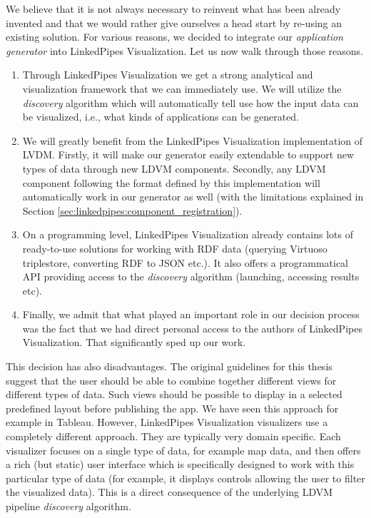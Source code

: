 We believe that it is not always necessary to reinvent what has been already invented and that we would rather give ourselves a head start by re-using an existing solution. For various reasons, we decided to integrate our \emph{application generator} into LinkedPipes Visualization. Let us now walk through those reasons.

\begin{enumerate}
\item Through LinkedPipes Visualization we get a strong analytical and visualization framework that we can immediately use. We will utilize the \emph{discovery} algorithm which will automatically tell use how the input data can be visualized, i.e., what kinds of applications can be generated.
\item We will greatly benefit from the LinkedPipes Visualization implementation of LVDM. Firstly, it will make our generator easily extendable to support new types of data through new LDVM components. Secondly, any LDVM component following the format defined by this implementation will automatically work in our generator as well (with the limitations explained in Section \ref{sec:linkedpipes:component_registration}).
\item On a programming level, LinkedPipes Visualization already contains lots of ready-to-use solutions for working with RDF data (querying Virtuoso triplestore, converting RDF to JSON etc.). It also offers a programmatical API providing access to the \emph{discovery} algorithm (launching, accessing results etc).
\item Finally, we admit that what played an important role in our decision process was the fact that we had direct personal access to the authors of LinkedPipes Visualization. That significantly sped up our work.

\end{enumerate}
This decision has also disadvantages. The original guidelines for this thesis suggest that the user should be able to combine together different views for different types of data. Such views should be possible to display in a selected predefined layout before publishing the app. We have seen this approach for example in Tableau. However, LinkedPipes Visualization visualizers use a completely different approach. They are typically very domain specific. Each visualizer focuses on a single type of data, for example map data, and then offers a rich (but static) user interface which is specifically designed to work with this particular type of data (for example, it displays controls allowing the user to filter the visualized data). This is a direct consequence of the underlying LDVM pipeline \emph{discovery} algorithm.

